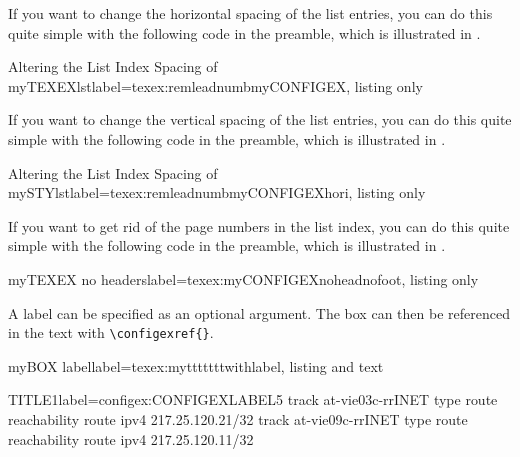 \documentclass[]{myHOWTO-V001}
\begin{document}
If you want to change the horizontal spacing of the list entries, you can do this quite simple with the following code in the preamble, which is illustrated in .

\begin{myTEXEXdoclst}{Altering the List Index Spacing of myTEXEXlst}{label={texex:remleadnumbmyCONFIGEX}, listing only}
\makeatletter
	\renewcommand{\l@myCONFIGEX}{\@dottedtocline{1}{0mm}{0mm}}
\makeatother
\end{myTEXEXdoclst}

If you want to change the vertical spacing of the list entries, you can do this quite simple with the following code in the preamble, which is illustrated in .

\begin{myTEXEXdoclst}{Altering the List Index Spacing of mySTYlst}{label={texex:remleadnumbmyCONFIGEXhori}, listing only}
\makeatletter
\makeatother
\end{myTEXEXdoclst}

If you want to get rid of the page numbers in the list index, you can do this quite simple with the following code in the preamble, which is illustrated in .

\begin{myTEXEXdoclst}{myTEXEX no headers}{label={texex:myCONFIGEXnoheadnofoot}, listing only}
\let\oldlistofmyCONFIGEX\listofmyCONFIGEX

\renewcommand\listofmyCONFIGEX
{
	\pagestyle{empty} %
	\oldlistofmyCONFIGEX %
	\clearpage %
	\pagestyle{plain} %
}
\end{myTEXEXdoclst}

A label can be specified as an optional argument. The box can then be referenced in the text with \Verb|\configexref{}|.

\begin{myTEXEXdoclst}{myBOX label}{label={texex:mytttttttwithlabel}, listing and text}
\begin{myCONFIGEXlst}{TITLE1}{label={configex:CONFIGEXLABEL5}}
track at-vie03c-rrINET type route reachability route ipv4 217.25.120.21/32
track at-vie09c-rrINET type route reachability route ipv4 217.25.120.11/32
\end{myCONFIGEXlst}
\end{myTEXEXdoclst}
\end{document}
